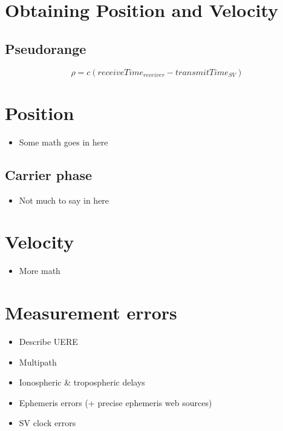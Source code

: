 \section{Obtaining Position and Velocity}

\subsection{Pseudorange}

%
\[\rho = c (receiveTime_{receiver} - transmitTime_{SV})\]
%

\section{Position}
\begin{itemize}
\item Some math goes in here
\end{itemize}

\subsection{Carrier phase}
\begin{itemize}
\item Not much to say in here
\end{itemize}

\section{Velocity}
\begin{itemize}
\item More math
\end{itemize}

\section{Measurement errors}
\begin{itemize}
\item Describe UERE
\end{itemize}

\begin{itemize}
\item Multipath
\item Ionospheric \& tropospheric delays
\item Ephemeris errors (+ precise ephemeris web sources)
\item SV clock errors
\end{itemize}

